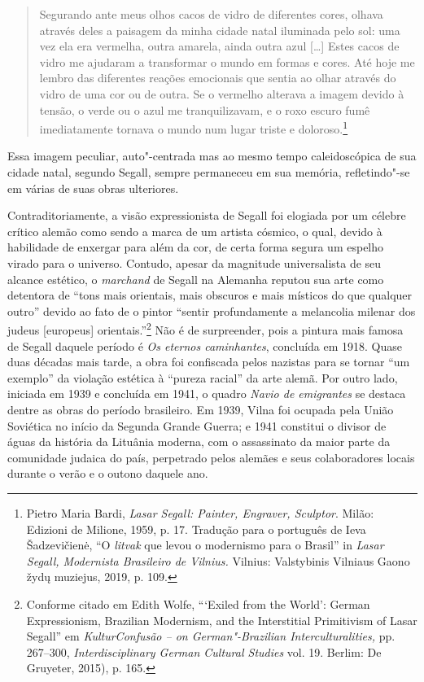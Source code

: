 \begin{quote}
Segurando ante meus olhos cacos de vidro de diferentes
cores, olhava através deles a paisagem da minha cidade natal iluminada
pelo sol: uma vez ela era vermelha, outra amarela, ainda outra azul [\ldots{}] Estes 
cacos de vidro me ajudaram a transformar o mundo em
formas e cores. Até hoje me lembro das diferentes reações emocionais que
sentia ao olhar através do vidro de uma cor ou de outra. Se o vermelho 
alterava a imagem devido à tensão, o verde ou o azul me
tranquilizavam, e o roxo escuro fumê imediatamente tornava o mundo num
lugar triste e doloroso.\footnote{Pietro Maria Bardi, \textit{Lasar
  Segall: Painter, Engraver, Sculptor}. Milão: Edizioni de Milione,
  1959, p. 17. Tradução para o português de Ieva Šadzevičienė, ``O
  \textit{litvak} que levou o modernismo para o Brasil'' in \textit{Lasar Segall,
  Modernista Brasileiro de Vilnius.} Vilnius: Valstybinis Vilniaus Gaono
  žydų muziejus, 2019, p. 109.} 
\end{quote}

Essa imagem peculiar, auto"-centrada mas
ao mesmo tempo caleidoscópica de sua cidade natal, segundo Segall,
sempre permaneceu em sua memória, refletindo"-se em várias de suas obras
ulteriores.

Contraditoriamente, a visão expressionista de Segall foi elogiada por um
célebre crítico alemão como sendo a marca de um artista cósmico, o qual,
devido à habilidade de enxergar para além da cor, de certa forma segura
um espelho virado para o universo. Contudo, apesar da magnitude
universalista de seu alcance estético, o \textit{marchand} de Segall na Alemanha
reputou sua arte como detentora de ``tons mais orientais, mais obscuros
e mais místicos do que qualquer outro'' devido ao fato de o pintor
``sentir profundamente a melancolia milenar dos judeus {[}europeus{]}
orientais.''\footnote{Conforme citado em Edith Wolfe, ```Exiled from
  the World': German Expressionism, Brazilian Modernism, and the
  Interstitial Primitivism of Lasar Segall'' em \textit{KulturConfusão -- on German"-Brazilian Interculturalities,} pp. 267--300, \textit{Interdisciplinary German Cultural Studies} vol. 19. Berlim: De
  Gruyeter, 2015), p. 165.} Não é de surpreender, pois a pintura mais
famosa de Segall daquele período é \textit{Os eternos caminhantes},
concluída em 1918. Quase duas décadas mais tarde, a obra foi confiscada
pelos nazistas para se tornar ``um exemplo'' da violação estética à
``pureza racial'' da arte alemã. Por outro lado, iniciada em 1939 e
concluída em 1941, o quadro \textit{Navio de emigrantes} se destaca dentre
as obras do período brasileiro. Em 1939, Vilna foi ocupada pela União
Soviética no início da Segunda Grande Guerra; e 1941 constitui o divisor
de águas da história da Lituânia moderna, com o assassinato da maior
parte da comunidade judaica do país, perpetrado pelos alemães e seus
colaboradores locais durante o verão e o outono daquele ano.

